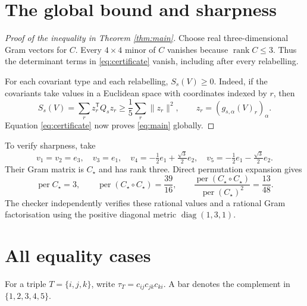 \documentclass[11pt,a4paper]{article}
\newcommand{\per}{\operatorname{per}}
\newcommand{\rank}{\operatorname{rank}}
\theoremstyle{remark}\newtheorem{remark}[theorem]{Remark}
\begin{document}
\section{The global bound and sharpness}
\begin{proof}[Proof of the inequality in Theorem \ref{thm:main}]
Choose real three-dimensional Gram vectors for $C$. Every $4\times4$ minor of $C$ vanishes because $\rank C\leq3$. Thus the determinant terms in \eqref{eq:certificate} vanish, including after every relabelling.

For each covariant type and each relabelling, $S_s(V)\geq0$. Indeed, if the covariants take values in a Euclidean space with coordinates indexed by $r$, then
\[
 S_s(V)=\sum_r z_r^{\mathsf T}Q_s z_r\geq \frac15\sum_r\|z_r\|^2,
 \qquad z_r=(g_{s,\alpha}(V)_r)_\alpha.
\]
Equation \eqref{eq:certificate} now proves \eqref{eq:main} globally.
\end{proof}

To verify sharpness, take
\[
 v_1=v_2=e_3,\quad v_3=e_1,\quad
 v_4=-\tfrac12e_1+\tfrac{\sqrt3}{2}e_2,\quad
 v_5=-\tfrac12e_1-\tfrac{\sqrt3}{2}e_2.
\]
Their Gram matrix is $C_\star$ and has rank three. Direct permutation expansion gives
\[
 \per C_\star=3,\qquad
 \per(C_\star\circ C_\star)=\frac{39}{16},\qquad
 \frac{\per(C_\star\circ C_\star)}{\per(C_\star)^2}=\frac{13}{48}.
\]
The checker independently verifies these rational values and a rational Gram factorisation using the positive diagonal metric $\operatorname{diag}(1,3,1)$.

\section{All equality cases}
For a triple $T=\{i,j,k\}$, write $\tau_T=c_{ij}c_{jk}c_{ki}$. A bar denotes the complement in $\{1,2,3,4,5\}$.
\end{document}
